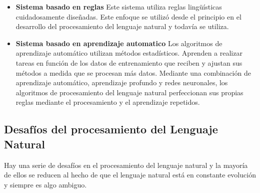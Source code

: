 \documentclass{llncs}
\begin{document}
	\begin{itemize}
		\item \textbf{Sistema basado en reglas} Este sistema utiliza reglas lingüísticas cuidadosamente diseñadas. Este enfoque se utilizó desde el principio en el desarrollo del procesamiento del lenguaje natural y todavía se utiliza.
		\item \textbf{Sistema basado en aprendizaje automatico}  Los algoritmos de aprendizaje automático utilizan métodos estadísticos. Aprenden a realizar tareas en función de los datos de entrenamiento que reciben y ajustan sus métodos a medida que se procesan más datos. Mediante una combinación de aprendizaje automático, aprendizaje profundo y redes neuronales, los algoritmos de procesamiento del lenguaje natural perfeccionan sus propias reglas mediante el procesamiento y el aprendizaje repetidos.
	\end{itemize}
	
	\subsection{Desafíos del procesamiento del Lenguaje Natural}
	
	Hay una serie de desafíos en el procesamiento del lenguaje natural y la mayoría de ellos se reducen al hecho de que el lenguaje natural está en constante evolución y siempre es algo ambiguo.
	
\end{document}
